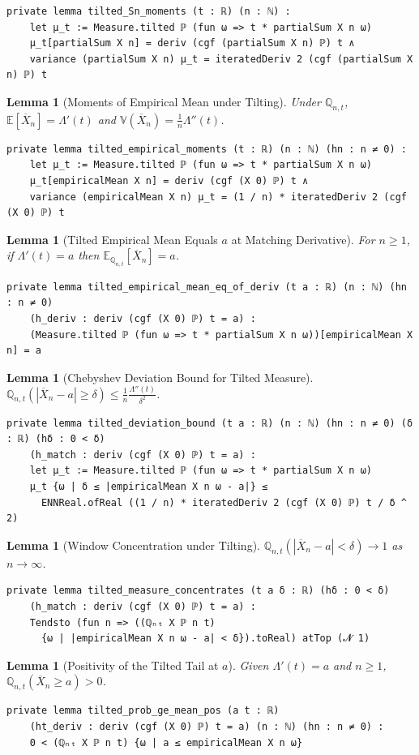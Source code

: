 \documentclass{article}
\newtheorem{lemma}[theorem]{Lemma}
\newcommand{\E}{\mathbb{E}}
\newcommand{\Q}{\mathbb{Q}}
\newcommand{\Var}{\mathbb{V}}
\begin{document}
\begin{lstlisting}
private lemma tilted_Sn_moments (t : ℝ) (n : ℕ) :
    let μ_t := Measure.tilted ℙ (fun ω => t * partialSum X n ω)
    μ_t[partialSum X n] = deriv (cgf (partialSum X n) ℙ) t ∧
    variance (partialSum X n) μ_t = iteratedDeriv 2 (cgf (partialSum X n) ℙ) t
\end{lstlisting}
\begin{lemma}[Moments of Empirical Mean under Tilting]
  Under $\Q_{n,t}$, $\E[\overline{X}_n] = \Lambda'(t)$ and $\Var(\overline{X}_n) = \frac{1}{n} \Lambda''(t)$.
\end{lemma}
\begin{lstlisting}
private lemma tilted_empirical_moments (t : ℝ) (n : ℕ) (hn : n ≠ 0) :
    let μ_t := Measure.tilted ℙ (fun ω => t * partialSum X n ω)
    μ_t[empiricalMean X n] = deriv (cgf (X 0) ℙ) t ∧
    variance (empiricalMean X n) μ_t = (1 / n) * iteratedDeriv 2 (cgf (X 0) ℙ) t
\end{lstlisting}
\newpage
\begin{lemma}[Tilted Empirical Mean Equals $a$ at Matching Derivative]
  For $n \ge 1$, if $\Lambda'(t) = a$ then $\E_{\Q_{n,t}}[\overline{X}_n] = a$.
\end{lemma}
\begin{lstlisting}
private lemma tilted_empirical_mean_eq_of_deriv (t a : ℝ) (n : ℕ) (hn : n ≠ 0)
    (h_deriv : deriv (cgf (X 0) ℙ) t = a) :
    (Measure.tilted ℙ (fun ω => t * partialSum X n ω))[empiricalMean X n] = a
\end{lstlisting}
\begin{lemma}[Chebyshev Deviation Bound for Tilted Measure]
  $\Q_{n,t}(|\overline{X}_n - a| \ge \delta) \le \frac{1}{n} \frac{\Lambda''(t)}{\delta^2}$.
\end{lemma}
\begin{lstlisting}
private lemma tilted_deviation_bound (t a : ℝ) (n : ℕ) (hn : n ≠ 0) (δ : ℝ) (hδ : 0 < δ)
    (h_match : deriv (cgf (X 0) ℙ) t = a) :
    let μ_t := Measure.tilted ℙ (fun ω => t * partialSum X n ω)
    μ_t {ω | δ ≤ |empiricalMean X n ω - a|} ≤
      ENNReal.ofReal ((1 / n) * iteratedDeriv 2 (cgf (X 0) ℙ) t / δ ^ 2)
\end{lstlisting}
\begin{lemma}[Window Concentration under Tilting]
  $\Q_{n,t}(|\overline{X}_n - a| < \delta) \to 1$ as $n \to \infty$.
\end{lemma}
\begin{lstlisting}
private lemma tilted_measure_concentrates (t a δ : ℝ) (hδ : 0 < δ)
    (h_match : deriv (cgf (X 0) ℙ) t = a) :
    Tendsto (fun n => ((ℚₙₜ X ℙ n t)
      {ω | |empiricalMean X n ω - a| < δ}).toReal) atTop (𝓝 1)
\end{lstlisting}
\begin{lemma}[Positivity of the Tilted Tail at $a$]
  Given $\Lambda'(t) = a$ and $n \ge 1$, $\Q_{n,t}(\overline{X}_n \ge a) > 0$.
\end{lemma}
\begin{lstlisting}
private lemma tilted_prob_ge_mean_pos (a t : ℝ)
    (ht_deriv : deriv (cgf (X 0) ℙ) t = a) (n : ℕ) (hn : n ≠ 0) :
    0 < (ℚₙₜ X ℙ n t) {ω | a ≤ empiricalMean X n ω}
\end{lstlisting}
\newpage
\end{document}
